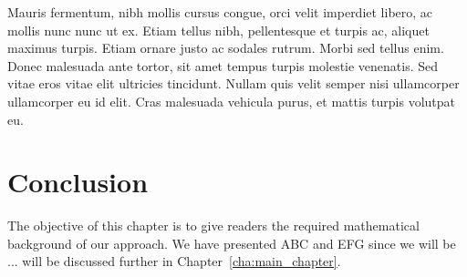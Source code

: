 Mauris fermentum, nibh mollis cursus congue, orci velit imperdiet libero, ac mollis nunc nunc ut ex. Etiam tellus nibh, pellentesque et turpis ac, aliquet maximus turpis. Etiam ornare justo ac sodales rutrum. Morbi sed tellus enim. Donec malesuada ante tortor, sit amet tempus turpis molestie venenatis. Sed vitae eros vitae elit ultricies tincidunt. Nullam quis velit semper nisi ullamcorper ullamcorper eu id elit. Cras malesuada vehicula purus, et mattis turpis volutpat eu.



\section{Conclusion}
\label{sec:background_conclusion}

The objective of this chapter is to give readers the required mathematical background of our approach. We have presented ABC and EFG since we will be ...  will be discussed further in Chapter~\ref{cha:main_chapter}.

